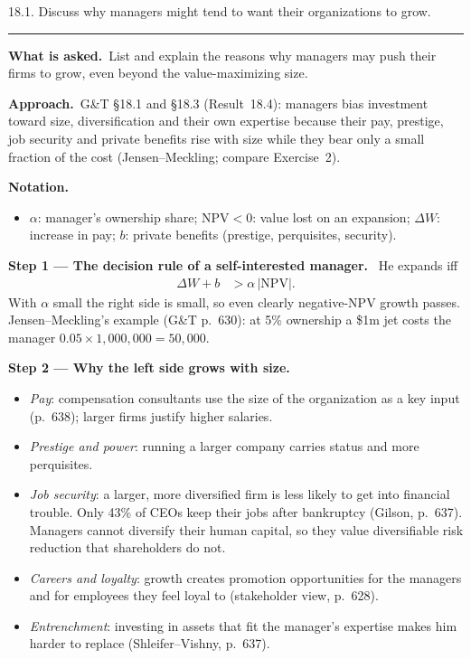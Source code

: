 \documentclass[11pt,a4paper]{article}
\newcommand{\notation}{\par\noindent\textbf{Notation.}}
\newcommand{\step}[2]{\par\medskip\noindent\textbf{Step #1 --- #2.}~}
\newcommand{\asked}{\par\medskip\noindent\textbf{What is asked.}~}
\newcommand{\approach}{\par\smallskip\noindent\textbf{Approach.}~}
\newcommand{\stmtend}{\par\endgroup\nopagebreak\noindent\rule{\linewidth}{0.4pt}\par\medskip}
\begin{document}
18.1. Discuss why managers might tend to want their organizations to grow.
\stmtend

\asked List and explain the reasons why managers may push their firms to grow, even beyond the value-maximizing size.

\approach G\&T \S18.1 and \S18.3 (Result~18.4): managers bias investment toward size, diversification and their own expertise because their pay, prestige, job security and private benefits rise with size while they bear only a small fraction of the cost (Jensen--Meckling; compare Exercise~2).

\notation
\begin{itemize}
  \item $\alpha$: manager's ownership share; $\mathrm{NPV}<0$: value lost on an expansion; $\Delta W$: increase in pay; $b$: private benefits (prestige, perquisites, security).
\end{itemize}

\step{1}{The decision rule of a self-interested manager} He expands iff
\begin{align}
  \Delta W + b &> \alpha\,|\mathrm{NPV}|. \label{r8be3-rule}
\end{align}
With $\alpha$ small the right side is small, so even clearly negative-NPV growth passes. Jensen--Meckling's example (G\&T p.~630): at 5\% ownership a \$1m jet costs the manager $0.05\times1{,}000{,}000=50{,}000$.

\step{2}{Why the left side grows with size}
\begin{itemize}
  \item \emph{Pay}: compensation consultants use the size of the organization as a key input (p.~638); larger firms justify higher salaries.
  \item \emph{Prestige and power}: running a larger company carries status and more perquisites.
  \item \emph{Job security}: a larger, more diversified firm is less likely to get into financial trouble. Only 43\% of CEOs keep their jobs after bankruptcy (Gilson, p.~637). Managers cannot diversify their human capital, so they value diversifiable risk reduction that shareholders do not.
  \item \emph{Careers and loyalty}: growth creates promotion opportunities for the managers and for employees they feel loyal to (stakeholder view, p.~628).
  \item \emph{Entrenchment}: investing in assets that fit the manager's expertise makes him harder to replace (Shleifer--Vishny, p.~637).
\end{itemize}
\end{document}
